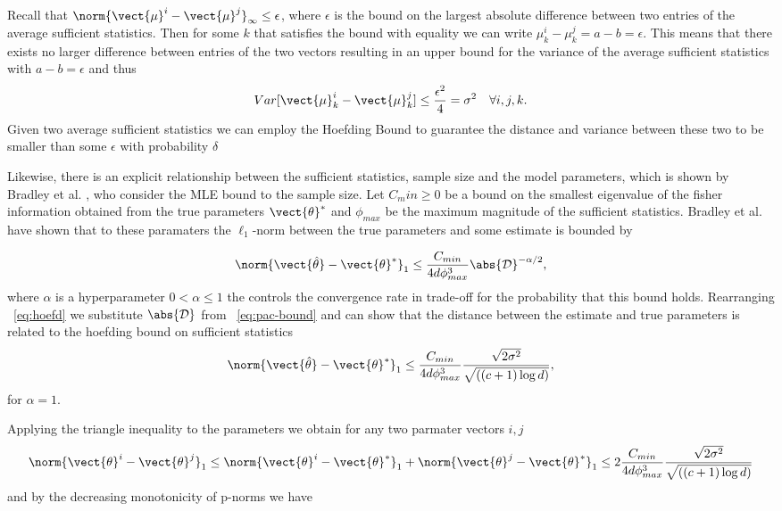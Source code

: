 Recall that $\norm{\vect{\mu}^{i} -  \vect{\mu}^{j}}_\infty \leq  \epsilon$, where $\epsilon$ is the bound on the largest absolute difference between two entries of the average sufficient statistics. 
Then for some $k$ that satisfies the bound with equality we can write $\mu^{i}_k - \mu^{j}_k = a - b  = \epsilon$.
This means that there exists no larger difference between entries of the two vectors resulting in an upper bound for the variance of the average sufficient statistics with $a - b = \epsilon$ and thus
\begin{equation*}
    Var[\vect{\mu}^{i}_k -  \vect{\mu}^{j}_k] \leq \frac{\epsilon^2}{4} = \sigma^2 \quad \forall i,j,k.
\end{equation*}
Given two average sufficient statistics we can employ the Hoefding Bound to guarantee the distance and variance between these two to be smaller than some $\epsilon$ with probability $\delta$

Likewise, there is an explicit relationship between the sufficient statistics, sample size and the model parameters, which is shown by Bradley et al. \cite{bradley2012sample}, who consider the MLE bound \wrt to the sample size. 
Let $C_min \geq 0$ be a bound on the smallest eigenvalue of the fisher information obtained from the true parameters $\vect{\theta}^*$ and $\phi_{max}$ be the maximum magnitude of the sufficient statistics. 
Bradley et al. have shown that \wrt to these paramaters the $\ell_1$-norm between the true parameters and some estimate is bounded by 

\begin{equation}
    \label{eq:pac-bound}
    \norm{\vect{\hat{\theta}}- \vect{\theta}^*}_1 \leq \frac{C_{min}}{4d\phi^3_{max}} \abs{\mathcal{D}}^{-\alpha/2},
\end{equation}
where $\alpha$ is a hyperparameter $0 < \alpha \leq 1$ the controls the convergence rate in trade-off for the probability that this bound holds. 
Rearranging \eq~\ref{eq:hoefd} we substitute $\abs{\mathcal{D}}$ from \eq~\ref{eq:pac-bound} and can show that the distance between the estimate and true parameters is related to the hoefding bound on sufficient statistics
\begin{equation}
    \norm{\vect{\hat{\theta}}- \vect{\theta}^*}_1 \leq \frac{C_{min}}{4d\phi^3_{max}} \frac{\sqrt{2\sigma^2}}{\sqrt{((c+1) \log d)}},
\end{equation}
for $\alpha =1$.

Applying the triangle inequality to the parameters we obtain for any two parmater vectors $i,j$
\begin{equation}
    \norm{\vect{\theta}^i- \vect{\theta}^j}_1 \leq  \norm{\vect{\theta}^i - \vect{\theta}^*}_1  +  \norm{\vect{\theta}^j- \vect{\theta}^*}_1 \leq 2 \frac{C_{min}}{4d\phi^3_{max}} \frac{\sqrt{2\sigma^2}}{\sqrt{((c+1) \log d)}}
\end{equation}
and by the decreasing monotonicity of p-norms \cite{raissouli2010various} we have

